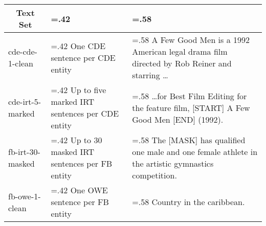 \begin{tabularx}{\textwidth}{| l | >{\hsize=.42\hsize}X | >{\hsize=.58\hsize}X |}
    \hline
    
    \multicolumn{1}{|c|}{\textbf{Text Set}} &
    \multicolumn{1}{|c|}{\textbf{Description}} &
    \multicolumn{1}{|c|}{\textbf{Example}} \\ 
    
    \hline \hline
    
    cde-cde-1-clean & One CDE sentence per CDE entity &
    A Few Good Men is a 1992 American legal drama film directed by Rob Reiner and starring \dots \\ \hline
    
    cde-irt-5-marked & Up to five marked IRT sentences per CDE entity &
    \dots for Best Film Editing for the feature film, [START] A Few Good Men [END] (1992). \\ \hline
    
    fb-irt-30-masked & Up to 30 masked IRT sentences per FB entity &
    The [MASK] has qualified one male and one female athlete in the artistic gymnastics competition. \\ \hline
    
    fb-owe-1-clean & One OWE sentence per FB entity &
    Country in the caribbean. \\ \hline

\end{tabularx}
